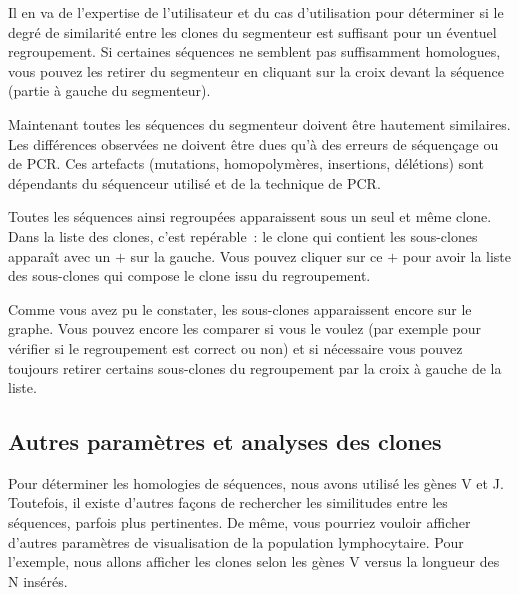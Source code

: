 \documentclass[11pt]{article}
\begin{document}
Il en va de l'expertise de l'utilisateur et du cas d'utilisation pour déterminer si le degré de
similarité entre les clones du segmenteur est suffisant pour un éventuel
regroupement. Si certaines séquences ne semblent pas suffisamment homologues,
vous pouvez les retirer du segmenteur en cliquant sur la croix devant la
séquence (partie à gauche du segmenteur).


Maintenant toutes les séquences du segmenteur doivent être hautement
similaires. Les différences observées ne doivent être dues qu'à des
erreurs de séquençage ou de PCR. Ces artefacts (mutations,
homopolymères, insertions, délétions) sont dépendants du séquenceur
utilisé et de la technique de PCR.


Toutes les séquences ainsi regroupées apparaissent sous un seul et même
clone. Dans la liste des clones, c'est repérable~: le clone qui contient
les sous-clones apparaît avec un $+$ sur la gauche. Vous pouvez
cliquer sur ce $+$ pour avoir la liste des sous-clones qui compose le
clone issu du regroupement.


Comme vous avez pu le constater, les sous-clones apparaissent encore sur
le graphe. Vous pouvez encore les comparer si vous le voulez (par
exemple pour vérifier si le regroupement est correct ou non) et si nécessaire
vous pouvez toujours retirer certains sous-clones du regroupement par la croix
à gauche de la liste.


\subsection{Autres paramètres et analyses des clones}

Pour déterminer les homologies de séquences, nous avons utilisé
les gènes V et J. Toutefois, il existe d'autres façons de
rechercher les similitudes entre les séquences, parfois plus
pertinentes. De même, vous pourriez vouloir afficher d'autres paramètres
de visualisation de la population lymphocytaire. Pour l'exemple, nous
allons afficher les clones selon les gènes V versus la longueur
des N insérés.
\end{document}
